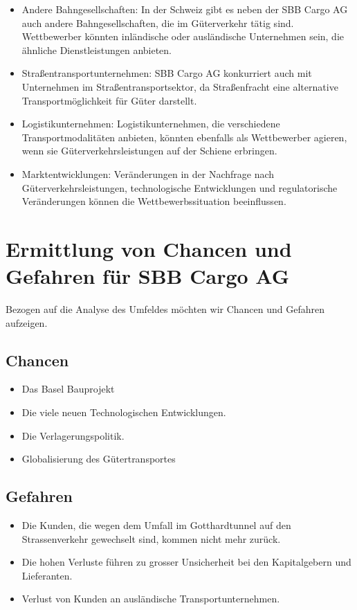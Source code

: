 \documentclass{article}
\begin{document}
\begin{itemize}
    \item Andere Bahngesellschaften:
    In der Schweiz gibt es neben der SBB Cargo AG auch andere Bahngesellschaften, die im Güterverkehr tätig sind.
    Wettbewerber könnten inländische oder ausländische Unternehmen sein, die ähnliche Dienstleistungen anbieten. 
    \item Straßentransportunternehmen:
    SBB Cargo AG konkurriert auch mit Unternehmen im Straßentransportsektor, da Straßenfracht eine alternative Transportmöglichkeit für Güter darstellt. 
    \item Logistikunternehmen:
    Logistikunternehmen, die verschiedene Transportmodalitäten anbieten, könnten ebenfalls als Wettbewerber agieren, wenn sie Güterverkehrsleistungen auf der Schiene erbringen.
    \item Marktentwicklungen:
    Veränderungen in der Nachfrage nach Güterverkehrsleistungen, technologische Entwicklungen und regulatorische Veränderungen können die Wettbewerbssituation beeinflussen. 
\end{itemize}

\section{Ermittlung von Chancen und Gefahren für SBB Cargo AG}

Bezogen auf die Analyse des Umfeldes möchten wir Chancen und Gefahren aufzeigen.

\subsection{Chancen}
\begin{itemize}
    \item Das Basel Bauprojekt
    \item Die viele neuen Technologischen Entwicklungen.
    \item Die Verlagerungspolitik.
    \item Globalisierung des Gütertransportes
\end{itemize}
\subsection{Gefahren}
\begin{itemize}
    \item Die Kunden, die wegen dem Umfall im Gotthardtunnel auf den Strassenverkehr gewechselt sind, kommen nicht mehr zurück.
    \item Die hohen Verluste führen zu grosser Unsicherheit bei den Kapitalgebern und Lieferanten.
    \item Verlust von Kunden an ausländische Transportunternehmen.
\end{itemize}
\end{document}
